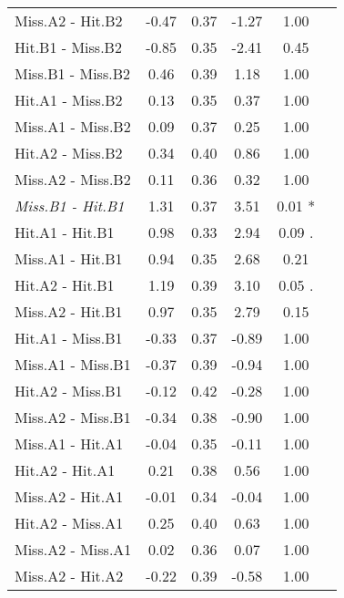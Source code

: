 \begin{landscape}
\begin{table}
\begin{multicols}{3}
\begin{tabular}{|l||*{5}{c|}}
Miss.A2 - Hit.B2 & -0.47 & 0.37 & -1.27 & 1.00 \\ 
Hit.B1 - Miss.B2 & -0.85 & 0.35 & -2.41 & 0.45 \\ 
Miss.B1 - Miss.B2 & 0.46 & 0.39 & 1.18 & 1.00 \\ 
Hit.A1 - Miss.B2 & 0.13 & 0.35 & 0.37 & 1.00 \\ 
Miss.A1 - Miss.B2 & 0.09 & 0.37 & 0.25 & 1.00 \\ 
Hit.A2 - Miss.B2 & 0.34 & 0.40 & 0.86 & 1.00 \\ 
Miss.A2 - Miss.B2 & 0.11 & 0.36 & 0.32 & 1.00 \\ 
\textit{Miss.B1 - Hit.B1} & 1.31 & 0.37 & 3.51 & 0.01 * \\ 
Hit.A1 - Hit.B1 & 0.98 & 0.33 & 2.94 & 0.09 . \\ 
Miss.A1 - Hit.B1 & 0.94 & 0.35 & 2.68 & 0.21 \\ 
Hit.A2 - Hit.B1 & 1.19 & 0.39 & 3.10 & 0.05 . \\ 
Miss.A2 - Hit.B1 & 0.97 & 0.35 & 2.79 & 0.15 \\ 
Hit.A1 - Miss.B1 & -0.33 & 0.37 & -0.89 & 1.00 \\ 
Miss.A1 - Miss.B1 & -0.37 & 0.39 & -0.94 & 1.00 \\ 
Hit.A2 - Miss.B1 & -0.12 & 0.42 & -0.28 & 1.00 \\ 
Miss.A2 - Miss.B1 & -0.34 & 0.38 & -0.90 & 1.00 \\ 
Miss.A1 - Hit.A1 & -0.04 & 0.35 & -0.11 & 1.00 \\ 
Hit.A2 - Hit.A1 & 0.21 & 0.38 & 0.56 & 1.00 \\ 
Miss.A2 - Hit.A1 & -0.01 & 0.34 & -0.04 & 1.00 \\ 
Hit.A2 - Miss.A1 & 0.25 & 0.40 & 0.63 & 1.00 \\ 
Miss.A2 - Miss.A1 & 0.02 & 0.36 & 0.07 & 1.00 \\ 
Miss.A2 - Hit.A2 & -0.22 & 0.39 & -0.58 & 1.00 \\ 
\hline
\end{tabular}


\end{multicols}
\end{table}
\end{landscape}
